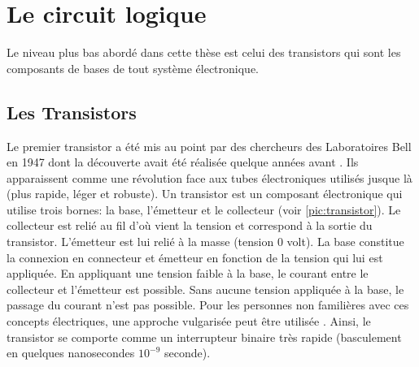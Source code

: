 \section{Le circuit logique} \label{sec:logique}
Le niveau plus bas abordé dans cette thèse est celui des transistors qui sont les composants de bases de tout système électronique. 

\subsection{Les Transistors}
Le premier transistor a été mis au point par des chercheurs des Laboratoires Bell en 1947 \cite{bardeen1948transistor} dont la découverte avait été réalisée quelque années avant \cite{edgar1930method}. Ils apparaissent comme une révolution face aux tubes électroniques utilisés jusque là (plus rapide, léger et robuste). Un transistor est un composant électronique qui utilise trois bornes: la base, l’émetteur et le collecteur (voir \autoref{pic:transistor}). Le collecteur est relié au fil d’où vient la tension et correspond à la sortie du transistor. L’émetteur est lui relié à la masse (tension 0 volt). La base constitue la connexion en connecteur et émetteur en fonction de la tension qui lui est appliquée. En appliquant une tension faible à la base, le courant entre le collecteur et l’émetteur est possible. Sans aucune tension appliquée à la base, le passage du courant n’est pas possible. Pour les personnes non familières avec ces concepts électriques, une approche vulgarisée peut être utilisée \cite{JohnLeDuc2017}. Ainsi, le transistor se comporte comme un interrupteur binaire très rapide (basculement en quelques nanosecondes $10^{-9}$ seconde).



